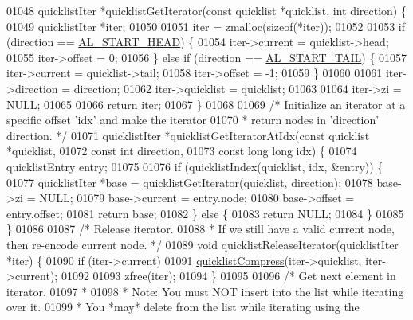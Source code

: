 \begin{DoxyCode}
{{{{{{{{01048 quicklistIter *quicklistGetIterator(\textcolor{keyword}{const} quicklist *quicklist, \textcolor{keywordtype}{int} direction) \{
01049     quicklistIter *iter;
01050 
01051     iter = zmalloc(\textcolor{keyword}{sizeof}(*iter));
01052 
01053     \textcolor{keywordflow}{if} (direction == \hyperlink{adlist_8h_a353f032fdd7e66abe9f194fa7c89560b}{AL\_START\_HEAD}) \{
01054         iter->current = quicklist->head;
01055         iter->offset = 0;
01056     \} \textcolor{keywordflow}{else} \textcolor{keywordflow}{if} (direction == \hyperlink{adlist_8h_a7d37e2046bb8d302b8ca5de4883a1c7f}{AL\_START\_TAIL}) \{
01057         iter->current = quicklist->tail;
01058         iter->offset = -1;
01059     \}
01060 
01061     iter->direction = direction;
01062     iter->quicklist = quicklist;
01063 
01064     iter->zi = NULL;
01065 
01066     \textcolor{keywordflow}{return} iter;
01067 \}
01068 
01069 \textcolor{comment}{/* Initialize an iterator at a specific offset 'idx' and make the iterator}
01070 \textcolor{comment}{ * return nodes in 'direction' direction. */}
01071 quicklistIter *quicklistGetIteratorAtIdx(\textcolor{keyword}{const} quicklist *quicklist,
01072                                          \textcolor{keyword}{const} \textcolor{keywordtype}{int} direction,
01073                                          \textcolor{keyword}{const} \textcolor{keywordtype}{long} \textcolor{keywordtype}{long} idx) \{
01074     quicklistEntry entry;
01075 
01076     \textcolor{keywordflow}{if} (quicklistIndex(quicklist, idx, &entry)) \{
01077         quicklistIter *base = quicklistGetIterator(quicklist, direction);
01078         base->zi = NULL;
01079         base->current = entry.node;
01080         base->offset = entry.offset;
01081         \textcolor{keywordflow}{return} base;
01082     \} \textcolor{keywordflow}{else} \{
01083         \textcolor{keywordflow}{return} NULL;
01084     \}
01085 \}
01086 
01087 \textcolor{comment}{/* Release iterator.}
01088 \textcolor{comment}{ * If we still have a valid current node, then re-encode current node. */}
01089 \textcolor{keywordtype}{void} quicklistReleaseIterator(quicklistIter *iter) \{
01090     \textcolor{keywordflow}{if} (iter->current)
01091         \hyperlink{quicklist_8c_a4711a946d258d25f4bedace1458a2a1c}{quicklistCompress}(iter->quicklist, iter->current);
01092 
01093     zfree(iter);
01094 \}
01095 
01096 \textcolor{comment}{/* Get next element in iterator.}
01097 \textcolor{comment}{ *}
01098 \textcolor{comment}{ * Note: You must NOT insert into the list while iterating over it.}
01099 \textcolor{comment}{ * You *may* delete from the list while iterating using the}
}}}}}}}}
\end{DoxyCode}
